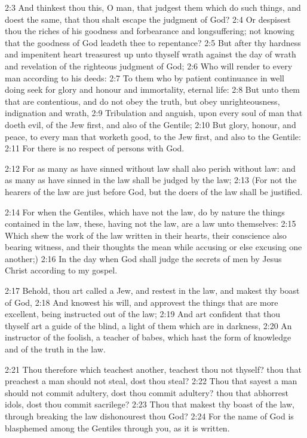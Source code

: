2:3 And thinkest thou this, O man, that judgest them which do such things, and doest the same, that thou shalt escape the judgment of God?  2:4 Or despisest thou the riches of his goodness and forbearance and longsuffering; not knowing that the goodness of God leadeth thee to repentance?  2:5 But after thy hardness and impenitent heart treasurest up unto thyself wrath against the day of wrath and revelation of the righteous judgment of God; 2:6 Who will render to every man according to his deeds: 2:7 To them who by patient continuance in well doing seek for glory and honour and immortality, eternal life: 2:8 But unto them that are contentious, and do not obey the truth, but obey unrighteousness, indignation and wrath, 2:9 Tribulation and anguish, upon every soul of man that doeth evil, of the Jew first, and also of the Gentile; 2:10 But glory, honour, and peace, to every man that worketh good, to the Jew first, and also to the Gentile: 2:11 For there is no respect of persons with God.

2:12 For as many as have sinned without law shall also perish without law: and as many as have sinned in the law shall be judged by the law; 2:13 (For not the hearers of the law are just before God, but the doers of the law shall be justified.

2:14 For when the Gentiles, which have not the law, do by nature the things contained in the law, these, having not the law, are a law unto themselves: 2:15 Which shew the work of the law written in their hearts, their conscience also bearing witness, and their thoughts the mean while accusing or else excusing one another;) 2:16 In the day when God shall judge the secrets of men by Jesus Christ according to my gospel.

2:17 Behold, thou art called a Jew, and restest in the law, and makest thy boast of God, 2:18 And knowest his will, and approvest the things that are more excellent, being instructed out of the law; 2:19 And art confident that thou thyself art a guide of the blind, a light of them which are in darkness, 2:20 An instructor of the foolish, a teacher of babes, which hast the form of knowledge and of the truth in the law.

2:21 Thou therefore which teachest another, teachest thou not thyself?  thou that preachest a man should not steal, dost thou steal?  2:22 Thou that sayest a man should not commit adultery, dost thou commit adultery? thou that abhorrest idols, dost thou commit sacrilege?  2:23 Thou that makest thy boast of the law, through breaking the law dishonourest thou God?  2:24 For the name of God is blasphemed among the Gentiles through you, as it is written.

